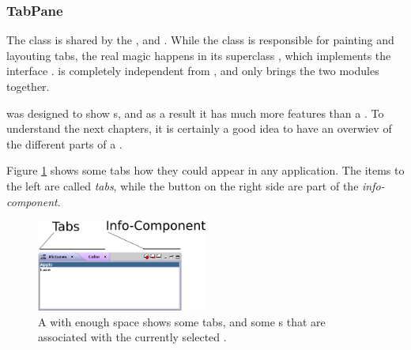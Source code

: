 
\subsubsection{TabPane}
The class  is shared by the , \linebreak {} and . While the class is responsible for painting and layouting tabs, the real magic happens in its superclass , which implements the interface .  is completely independent from , and only  brings the two modules together.


 was designed to show s, and as a result it has much more features than a . To understand the next chapters, it is certainly a good idea to have an overwiev of the different parts of a .

Figure \ref{fig:tabsOverview} shows some tabs how they could appear in any application. The items to the left are called \emph{tabs}, while the button on the right side are part of the \emph{info-component}.

\begin{figure}[h!]
  \centering
    \includegraphics[width=0.5\textwidth]{stations/tabsOverview}
  \caption{A  with enough space shows some tabs, and some s that are associated with the currently selected .}
  \label{fig:tabsOverview}
\end{figure}

